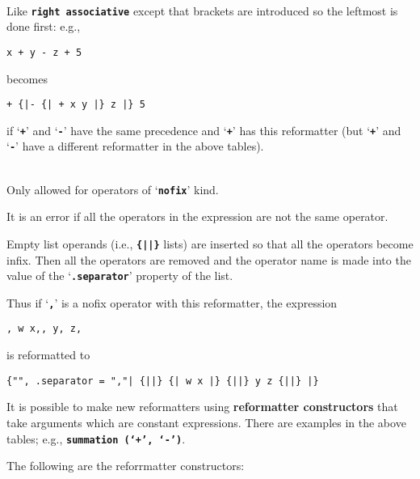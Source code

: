 \documentclass[12pt]{article}
\newcommand{\TT}[1]{{\tt \bfseries #1}}
\newcommand{\key}[1]{{\rm \bfseries #1}}
\newcommand{\ttkey}[1]{{\tt \bfseries #1}}
\newenvironment{indpar}[1][0.3in]%
	{\begin{list}{}%
		     {\setlength{\itemsep}{0in}%
		      \setlength{\topsep}{0in}%
		      \setlength{\parsep}{1ex}%
		      \setlength{\labelwidth}{#1}%
		      \setlength{\leftmargin}{#1}%
		      \addtolength{\leftmargin}{\labelsep}}%
	 \item}%
	{\end{list}}
\begin{document}
\begin{indpar}[0.5in]
\hspace*{-0.3in}\ttkey{left associative} \\
Like \TT{right associative} except that brackets are introduced
so the leftmost is done first:
e.g.,
\begin{center}
\tt x + y - z + 5
\end{center}
becomes
\begin{center}
\tt + \{|- \{| + x y |\} z |\} 5
\end{center}
if `\TT{+}' and `\TT{-}' have the same precedence and `\TT{+}' has
this reformatter (but `\TT{+}' and `\TT{-}' have a different
reformatter in the above tables).

\hspace*{-0.3in}\ttkey{separator} \\
Only allowed for operators of `\TT{nofix}' kind.

It is an error if all the operators in the expression are not
the same operator.

Empty list operands (i.e., \TT{\{||\}} lists) are inserted so that all
the operators become infix.
Then all the operators are removed and the operator name is made
into the value of the `\TT{.separator}' property of the list.

Thus if `\TT{,}' is a nofix operator with this reformatter,
the expression
\begin{center}
\tt , w x,, y, z,
\end{center}
is reformatted to
\begin{center}
\tt \{"", .separator = ","| \{||\} \{| w x |\} \{||\} y z \{||\} |\}
\end{center}


\end{indpar}

It is possible to make new reformatters using \key{reformatter constructors}
that take arguments which are constant expressions.  There are examples
in the above tables; e.g., \TT{summation (`+', `-')}.

The following are the reforrmatter constructors:
\end{document}

